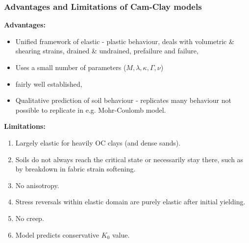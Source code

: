 \documentclass[notes]{beamer}
\begin{document}
\begin{frame}
\frametitle{Advantages and Limitations of Cam-Clay models}
\textbf{Advantages:}
\begin{itemize}
	\item Unified framework of elastic - plastic behaviour, deals with volumetric \& shearing
	strains, drained \& undrained, prefailure and failure,
	\item Uses a small number of parameters ($M, \lambda, \kappa, \Gamma, \nu$)
	\item fairly well established,
	\item Qualitative prediction of soil behaviour
	- replicates many behaviour not possible to replicate in e.g. Mohr-Coulomb model.
\end{itemize}
\textbf{Limitations:}
\begin{enumerate}
	\item Largely elastic for heavily OC clays (and dense sands).
	\item Soils do not always reach the critical state or necessarily stay there, such as by
	breakdown in fabric strain softening.
	\item No anisotropy.
	\item Stress reversals within elastic domain are purely elastic after initial yielding.
	\item No creep.
	\item Model predicts conservative $K_0$ value.
\end{enumerate}
\end{frame}

\end{document}
